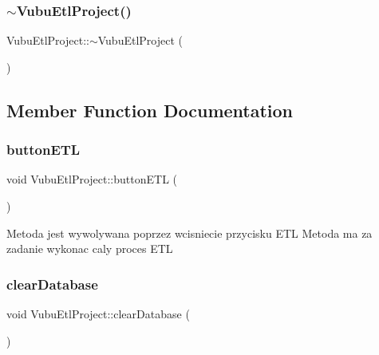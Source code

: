 \mbox{\label{class_vubu_etl_project_acdf754deee05e28e8f35682e5b863aab}} 
\subsubsection{\texorpdfstring{$\sim$\+Vubu\+Etl\+Project()}{~VubuEtlProject()}}
{\footnotesize\ttfamily Vubu\+Etl\+Project\+::$\sim$\+Vubu\+Etl\+Project (\begin{DoxyParamCaption}{ }\end{DoxyParamCaption})}



\subsection{Member Function Documentation}
\mbox{\label{class_vubu_etl_project_a2f4f3c71af6c416ba1e3fa90adb742d1}} 
\subsubsection{\texorpdfstring{button\+E\+TL}{buttonETL}}
{\footnotesize\ttfamily void Vubu\+Etl\+Project\+::button\+E\+TL (\begin{DoxyParamCaption}{ }\end{DoxyParamCaption})\hspace{0.3cm}{\ttfamily [slot]}}

Metoda jest wywolywana poprzez wcisniecie przycisku E\+TL Metoda ma za zadanie wykonac caly proces E\+TL \mbox{\label{class_vubu_etl_project_a767b72fe3e958c20bb2aa0e11a702f0f}} 
\subsubsection{\texorpdfstring{clear\+Database}{clearDatabase}}
{\footnotesize\ttfamily void Vubu\+Etl\+Project\+::clear\+Database (\begin{DoxyParamCaption}{ }\end{DoxyParamCaption})\hspace{0.3cm}{\ttfamily [slot]}}



